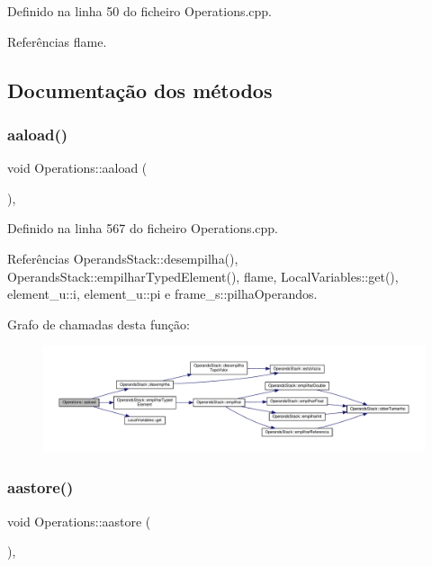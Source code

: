 Definido na linha 50 do ficheiro Operations.\+cpp.



Referências flame.



\subsection{Documentação dos métodos}
\mbox{\label{classOperations_a522dfa2224d54268008f3bec4ff2b388}} 
\subsubsection{\texorpdfstring{aaload()}{aaload()}}
{\footnotesize\ttfamily void Operations\+::aaload (\begin{DoxyParamCaption}{ }\end{DoxyParamCaption})\hspace{0.3cm}{\ttfamily [static]}, {\ttfamily [private]}}



Definido na linha 567 do ficheiro Operations.\+cpp.



Referências Operands\+Stack\+::desempilha(), Operands\+Stack\+::empilhar\+Typed\+Element(), flame, Local\+Variables\+::get(), element\+\_\+u\+::i, element\+\_\+u\+::pi e frame\+\_\+s\+::pilha\+Operandos.

Grafo de chamadas desta função\+:
\nopagebreak
\begin{figure}[H]
\begin{center}
\leavevmode
\includegraphics[width=350pt]{classOperations_a522dfa2224d54268008f3bec4ff2b388_cgraph}
\end{center}
\end{figure}
\mbox{\label{classOperations_a60b30bd84b2d59334e735f0adda6febe}} 
\subsubsection{\texorpdfstring{aastore()}{aastore()}}
{\footnotesize\ttfamily void Operations\+::aastore (\begin{DoxyParamCaption}{ }\end{DoxyParamCaption})\hspace{0.3cm}{\ttfamily [static]}, {\ttfamily [private]}}



